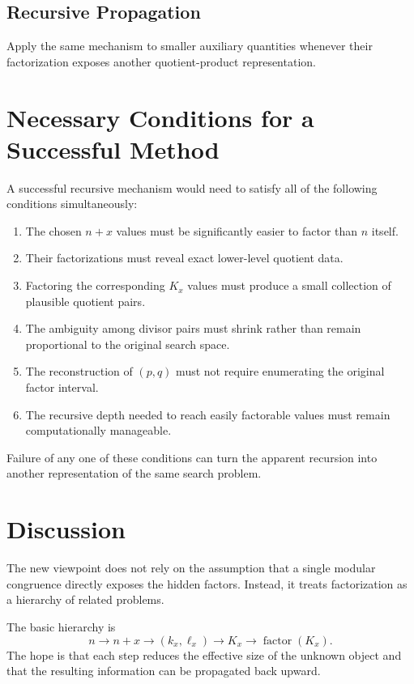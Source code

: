 \documentclass[11pt,a4paper]{article}
\begin{document}
\subsection{Recursive Propagation}
Apply the same mechanism to smaller auxiliary quantities whenever their
factorization exposes another quotient-product representation.

\section{Necessary Conditions for a Successful Method}

A successful recursive mechanism would need to satisfy all of the following
conditions simultaneously:

\begin{enumerate}[label=(\arabic*)]
    \item The chosen $n+x$ values must be significantly easier to factor
    than $n$ itself.
    \item Their factorizations must reveal exact lower-level quotient data.
    \item Factoring the corresponding $K_x$ values must produce a small
    collection of plausible quotient pairs.
    \item The ambiguity among divisor pairs must shrink rather than remain
    proportional to the original search space.
    \item The reconstruction of $(p,q)$ must not require enumerating the
    original factor interval.
    \item The recursive depth needed to reach easily factorable values must
    remain computationally manageable.
\end{enumerate}

Failure of any one of these conditions can turn the apparent recursion into
another representation of the same search problem.

\section{Discussion}

The new viewpoint does not rely on the assumption that a single modular
congruence directly exposes the hidden factors. Instead, it treats
factorization as a hierarchy of related problems.

The basic hierarchy is
\[
    n
    \longrightarrow
    n+x
    \longrightarrow
    (k_x,\ell_x)
    \longrightarrow
    K_x
    \longrightarrow
    \operatorname{factor}(K_x).
\]
The hope is that each step reduces the effective size of the unknown
object and that the resulting information can be propagated back upward.
\end{document}
